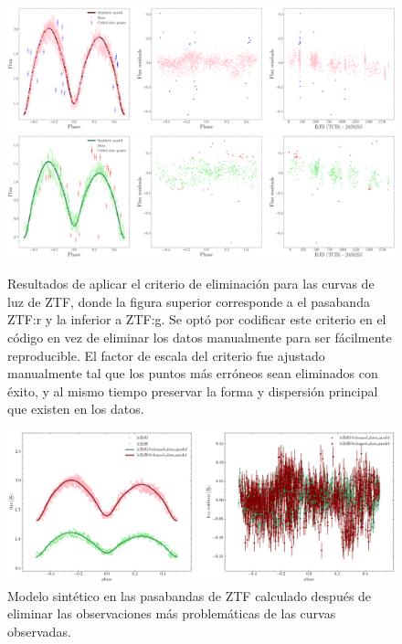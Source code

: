 \begin{figure}[!ht]
	\centering
	\includegraphics[scale=0.24]{Metodologia/Secciones/ModeloComputacional/Figures/Figura Malas Observaciones ZTF:r.png}
	\includegraphics[scale=0.24]{Metodologia/Secciones/ModeloComputacional/Figures/Figura Malas Observaciones ZTF:g.png}
	\caption{Resultados de aplicar el criterio de eliminación para las curvas de
	luz de ZTF, donde la figura superior corresponde a el pasabanda ZTF:r y la
	inferior a ZTF:g. Se optó por codificar este criterio en el código en vez de
	eliminar los datos manualmente para ser fácilmente reproducible. El factor
	de escala del criterio fue ajustado manualmente tal que los puntos más
	erróneos sean eliminados con éxito, y al mismo tiempo preservar la forma y
	dispersión principal que existen en los datos.}
	\label{figuraEliminarMalasObservacionesZtf}
\end{figure}

\begin{figure}[!ht]
	\centering
	\includegraphics[scale=0.44]{Metodologia/Secciones/ModeloComputacional/Figures/Figura Modelo Sin Malas Observaciones ZTF.png}
	\caption{Modelo sintético en las pasabandas de ZTF calculado después de
	eliminar las observaciones más problemáticas de las curvas observadas.}
	\label{figuraModeloSinMalasObservacionesZtf}
\end{figure}

